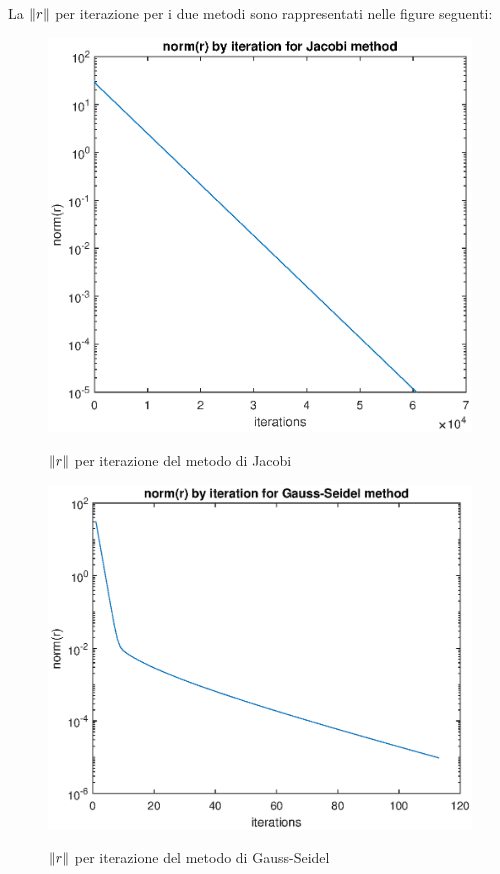 La $\norm{r}$ per iterazione per i due metodi sono rappresentati nelle figure seguenti:
\begin{figure}[h!]
    \centering
    \includegraphics[scale=0.8]{./capitolo_6/exercise_6_5_jacobi}
    \label{fig:6_5_jacobi}
    \caption{$\norm{r}$ per iterazione del metodo di Jacobi}
\end{figure}
\begin{figure}[h!]
    \centering
    \includegraphics[scale=0.8]{./capitolo_6/exercise_6_5_gauss}
    \label{fig:6_5_gauss}
    \caption{$\norm{r}$ per iterazione del metodo di Gauss-Seidel}
\end{figure}